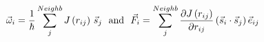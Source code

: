 \documentclass[preview]{standalone}
\begin{document}
\begin{varwidth}{50in}
  \begin{equation}
    \vec{\omega}_{i} = \frac{1}{\hbar} \sum_{j}^{Neighb} {J} 
    \left(r_{ij} \right)\,\vec{s}_{j} 
    ~~{\rm and}~~ 
    \vec{F}_{i} = \sum_{j}^{Neighb} \frac{\partial {J} \left(r_{ij} \right)}{
    \partial r_{ij}} \left( \vec{s}_{i}\cdot \vec{s}_{j} \right) \vec{e}_{ij}  
    \nonumber
  \end{equation}
\end{varwidth}
\end{document}
